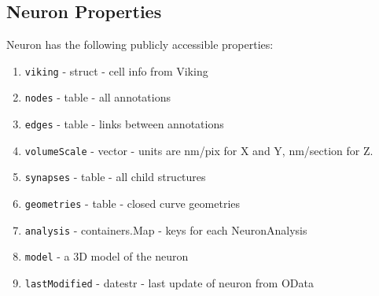 \documentclass[12pt]{exam}
\begin{document}
	\subsection{Neuron Properties}
	Neuron has the following publicly accessible properties:
	\begin{enumerate}
		\item \texttt{viking} - struct - cell info from Viking
		\item \texttt{nodes} - table - all annotations 
		\item \texttt{edges} - table - links between annotations
		\item \texttt{volumeScale} - vector - units are nm/pix for X and Y, nm/section for Z.
		\item \texttt{synapses} - table - all child structures
		\item \texttt{geometries} - table - closed curve geometries
		\item \texttt{analysis} - containers.Map - keys for each NeuronAnalysis
		\item \texttt{model} - a 3D model of the neuron
		\item \texttt{lastModified} - datestr - last update of neuron from OData
	\end{enumerate}
\end{document}

